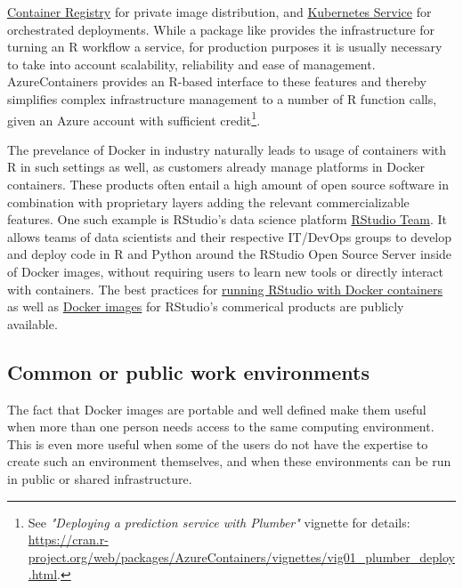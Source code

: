 \href{https://azure.microsoft.com/en-us/services/container-registry/}{Container
Registry} for private image distribution, and
\href{https://azure.microsoft.com/en-us/services/kubernetes-service/}{Kubernetes
Service} for orchestrated deployments. While a package like
 provides the infrastructure for turning an R workflow
a service, for production purposes it is usually necessary to take into
account scalability, reliability and ease of management. AzureContainers
provides an R-based interface to these features and thereby simplifies
complex infrastructure management to a number of R function calls, given
an Azure account with sufficient
credit\footnote{See \emph{"Deploying a prediction service with Plumber"} vignette for details:  \href{https://cran.r-project.org/web/packages/AzureContainers/vignettes/vig01_plumber_deploy.html}{https://cran.r-project.org/web/packages/AzureContainers/vignettes/vig01\_plumber\_deploy.html}.}.

The prevelance of Docker in industry naturally leads to usage of
containers with R in such settings as well, as customers already manage
platforms in Docker containers. These products often entail a high
amount of open source software in combination with proprietary layers
adding the relevant commercializable features. One such example is
RStudio's data science platform
\href{https://rstudio.com/products/team/}{RStudio Team}. It allows teams
of data scientists and their respective IT/DevOps groups to develop and
deploy code in R and Python around the RStudio Open Source Server inside
of Docker images, without requiring users to learn new tools or directly
interact with containers. The best practices for
\href{https://support.rstudio.com/hc/en-us/articles/360021594513-Running-RStudio-with-Docker-containers}{running
RStudio with Docker containers} as well as
\href{https://github.com/rstudio/rstudio-docker-products}{Docker images}
for RStudio's commerical products are publicly available.

\hypertarget{common-or-public-work-environments}{%
\subsection{Common or public work
environments}\label{common-or-public-work-environments}}

\label{workenvs}

The fact that Docker images are portable and well defined make them
useful when more than one person needs access to the same computing
environment. This is even more useful when some of the users do not have
the expertise to create such an environment themselves, and when these
environments can be run in public or shared infrastructure.

